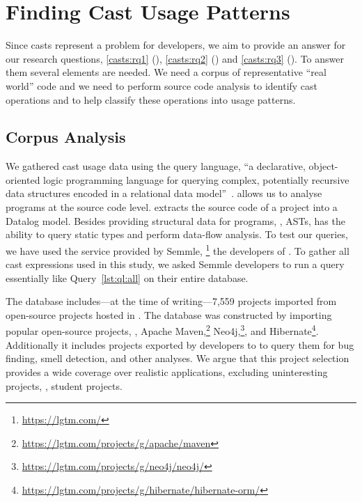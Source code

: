 \section{Finding Cast Usage Patterns}
\label{sec:casts:methodology}

Since casts represent a problem for developers,
we aim to provide an answer for our research questions,
\ref{casts:rq1} (\emph{\crqA}),
\ref{casts:rq2} (\emph{\crqB}) and
\ref{casts:rq3} (\emph{\crqC}).
To answer them several elements are needed.
We need a corpus of representative ``real world'' code and we need to perform
source code analysis to identify cast operations and to help classify these
operations into usage patterns.


\subsection{Corpus Analysis}

We gathered cast usage data using the \ql{} query language,
``a declarative, object-oriented logic programming language for querying
complex, potentially recursive data structures encoded in a relational data
model''~\citep{avgustinovQLObjectorientedQueries2016}.
\ql{} allows us to analyse programs at the source code level.
\ql{} extracts the source code of a project into a Datalog model.
Besides providing structural data for programs, \ie{}, ASTs,
\ql{} has the ability to query static types and perform data-flow analysis.
To test our \ql{} queries,
we have used the \lgtm{} service provided by Semmle,%
\footnote{\url{https://lgtm.com/}}
the developers of \ql{}.
To gather all cast expressions used in this study,
we asked Semmle developers to run a query essentially like Query~\ref{lst:ql:all} on their entire database.

The \lgtm{} database includes---at the time of writing---7,559 \java{} projects imported from
open-source projects hosted in \github{}.
The \lgtm{} database was constructed by importing popular open-source projects, \eg{},
Apache Maven,\footnote{\url{https://lgtm.com/projects/g/apache/maven}}
Neo4j,\footnote{\url{https://lgtm.com/projects/g/neo4j/neo4j/}}, and
Hibernate\footnote{\url{https://lgtm.com/projects/g/hibernate/hibernate-orm/}}.
Additionally it includes projects exported by developers
to \lgtm{} to query them for bug finding, smell detection, and
other analyses.
We argue that this project selection provides a wide coverage over realistic
\java{} applications, excluding
uninteresting projects, \eg{}, student projects.

